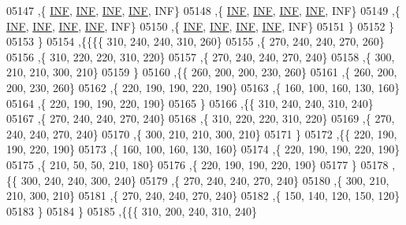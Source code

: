 \begin{DoxyCode}
05147     ,\{   \hyperlink{energy__const_8h_a12c2040f25d8e3a7b9e1c2024c618cb6}{INF},   \hyperlink{energy__const_8h_a12c2040f25d8e3a7b9e1c2024c618cb6}{INF},   \hyperlink{energy__const_8h_a12c2040f25d8e3a7b9e1c2024c618cb6}{INF},   \hyperlink{energy__const_8h_a12c2040f25d8e3a7b9e1c2024c618cb6}{INF},   INF\}
05148     ,\{   \hyperlink{energy__const_8h_a12c2040f25d8e3a7b9e1c2024c618cb6}{INF},   \hyperlink{energy__const_8h_a12c2040f25d8e3a7b9e1c2024c618cb6}{INF},   \hyperlink{energy__const_8h_a12c2040f25d8e3a7b9e1c2024c618cb6}{INF},   \hyperlink{energy__const_8h_a12c2040f25d8e3a7b9e1c2024c618cb6}{INF},   INF\}
05149     ,\{   \hyperlink{energy__const_8h_a12c2040f25d8e3a7b9e1c2024c618cb6}{INF},   \hyperlink{energy__const_8h_a12c2040f25d8e3a7b9e1c2024c618cb6}{INF},   \hyperlink{energy__const_8h_a12c2040f25d8e3a7b9e1c2024c618cb6}{INF},   \hyperlink{energy__const_8h_a12c2040f25d8e3a7b9e1c2024c618cb6}{INF},   INF\}
05150     ,\{   \hyperlink{energy__const_8h_a12c2040f25d8e3a7b9e1c2024c618cb6}{INF},   \hyperlink{energy__const_8h_a12c2040f25d8e3a7b9e1c2024c618cb6}{INF},   \hyperlink{energy__const_8h_a12c2040f25d8e3a7b9e1c2024c618cb6}{INF},   \hyperlink{energy__const_8h_a12c2040f25d8e3a7b9e1c2024c618cb6}{INF},   INF\}
05151     \}
05152    \}
05153   \}
05154  ,\{\{\{\{   310,   240,   240,   310,   260\}
05155     ,\{   270,   240,   240,   270,   260\}
05156     ,\{   310,   220,   220,   310,   220\}
05157     ,\{   270,   240,   240,   270,   240\}
05158     ,\{   300,   210,   210,   300,   210\}
05159     \}
05160    ,\{\{   260,   200,   200,   230,   260\}
05161     ,\{   260,   200,   200,   230,   260\}
05162     ,\{   220,   190,   190,   220,   190\}
05163     ,\{   160,   100,   160,   130,   160\}
05164     ,\{   220,   190,   190,   220,   190\}
05165     \}
05166    ,\{\{   310,   240,   240,   310,   240\}
05167     ,\{   270,   240,   240,   270,   240\}
05168     ,\{   310,   220,   220,   310,   220\}
05169     ,\{   270,   240,   240,   270,   240\}
05170     ,\{   300,   210,   210,   300,   210\}
05171     \}
05172    ,\{\{   220,   190,   190,   220,   190\}
05173     ,\{   160,   100,   160,   130,   160\}
05174     ,\{   220,   190,   190,   220,   190\}
05175     ,\{   210,    50,    50,   210,   180\}
05176     ,\{   220,   190,   190,   220,   190\}
05177     \}
05178    ,\{\{   300,   240,   240,   300,   240\}
05179     ,\{   270,   240,   240,   270,   240\}
05180     ,\{   300,   210,   210,   300,   210\}
05181     ,\{   270,   240,   240,   270,   240\}
05182     ,\{   150,   140,   120,   150,   120\}
05183     \}
05184    \}
05185   ,\{\{\{   310,   200,   240,   310,   240\}

\end{DoxyCode}
